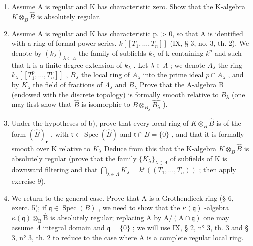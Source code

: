 \begin{enumerate}
\def\labelenumi{\alph{enumi})}
\item
  Assume A is regular and K has characteristic zero. Show that the K-algebra \(K \otimes_{B} \widehat{B}\) is absolutely regular.
\item
  Assume A is regular and K has characteristic p. \textgreater{} 0, so that A is identified with a ring of formal power series. \(k[[T_{1}, \ldots, T_{n}]]\) (IX, § 3, no. 3, th. 2). We denote by \((k_{\lambda})_{\lambda \subset \Lambda}\) the family of subfields \(k_{\lambda}\) of k containing \(k^{p}\) and such that k is a finite-degree extension of \(k_{\lambda}\) . Let \(\lambda \in \Lambda\) ; we denote \(A_{\lambda}\) the ring \(k_{\lambda}[[T_{1}^{p}, \ldots, T_{n}^{p}]]\) , \(B_{\lambda}\) the local ring of \(A_{\lambda}\) into the prime ideal \(p \cap A_{\lambda}\) , and by \(K_{\lambda}\) the field of fractions of \(\Lambda_{\lambda}\) and \(B_{\lambda}\) Prove that the A-algebra B (endowed with the discrete topology) is formally smooth relative to \(B_{\lambda}\) (one may first show that \(\widehat{B}\) is isomorphic to \(B \otimes_{B_{\lambda}} \widehat{B_{\lambda}}\) ).
\item
  Under the hypotheses of b), prove that every local ring of \(K \otimes_{B} \widehat{B}\) is of the form \((\widehat{B})_{\mathbf{r}}\) , with \(\mathfrak{r} \in \operatorname{Spec}(\widehat{B})\) and \(\mathfrak{r} \cap B = \{0\}\) , and that it is formally smooth over K relative to \(K_{\lambda}\) Deduce from this that the K-algebra \(K \otimes_{B} \widehat{B}\) is absolutely regular (prove that the family \(\{K_{\lambda}\}_{\lambda \in \Lambda}\) of subfields of K is downward filtering and that \(\bigcap_{\lambda \in \Lambda} K_{\lambda} = k^{p}((T_{1}, \ldots, T_{n}))\) ; then apply exercise 9).
\item
  We return to the general case. Prove that A is a Grothendieck ring (§ 6, exerc. 5); if \(\mathfrak{q} \in \operatorname{Spec}(B)\) , we need to show that the \(\kappa(\mathfrak{q})\) -algebra \(\kappa(\mathfrak{q}) \otimes_{\mathrm{B}} \widehat{\mathrm{B}}\) is absolutely regular; replacing A by \(\mathrm{A}/(\mathrm{A} \cap \mathfrak{q})\) one may assume \(\Lambda\) integral domain and \(\mathfrak{q} = \{0\}\) ; we will use IX, § 2, n° 3, th. 3 and § 3, n° 3, th. 2 to reduce to the case where A is a complete regular local ring.
\end{enumerate}

